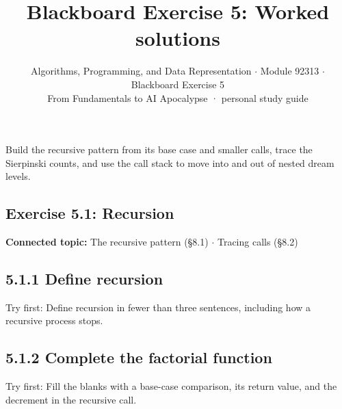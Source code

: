 \documentclass[11pt]{article}
\title{\sffamily\bfseries\color{FAUblue}Blackboard Exercise 5: Worked solutions}
\author{Algorithms, Programming, and Data Representation \ensuremath{\cdot} Module 92313 \ensuremath{\cdot} Blackboard Exercise 5\\[2pt]\small From Fundamentals to AI Apocalypse · personal study guide}
\date{}
\begin{document}
\maketitle
\begingroup\footnotesize\setlength{\parskip}{0pt}\tableofcontents\endgroup
\clearpage

{\large Build the recursive pattern from its base case and smaller calls, trace the Sierpinski counts, and use the call stack to move into and out of nested dream levels.}


\begin{keepsection}
\section{Exercise 5.1: Recursion}

\textbf{Connected topic:} The recursive pattern (§8.1) \ensuremath{\cdot} Tracing calls (§8.2)

\begin{keepsection}
\subsection{5.1.1 Define recursion}

Try first: Define recursion in fewer than three sentences, including how a recursive process stops.

\end{keepsection}

\begin{keepsection}
\subsection{5.1.2 Complete the factorial function}

Try first: Fill the blanks with a base-case comparison, its return value, and the decrement in the recursive call.

\end{keepsection}
\end{keepsection}
\end{document}

